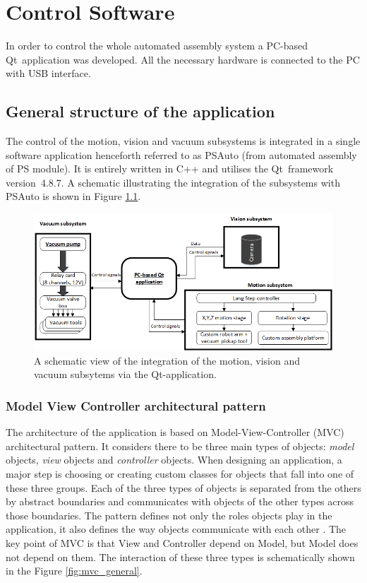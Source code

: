 \chapter{Control Software}

In order to control the whole automated assembly system a PC-based Qt~application was developed. All the necessary hardware is connected to the PC with USB interface.

\section{General structure of the application}

The control of the motion, vision and vacuum subsystems is integrated in a single software application henceforth referred to as PSAuto (from automated assembly of PS module). It is entirely written in C++ and utilises the Qt~framework version~4.8.7. A schematic illustrating the integration of the subsystems with PSAuto is shown in Figure \ref{fig:general_app_structure}.

\begin{figure}[ht]\centering
\includegraphics[width=1\linewidth]{Data/Control_Software/Whole_system_diagram_(English).png}
\caption{A schematic view of the integration of the motion, vision and vacuum subsytems via the Qt-application.}
\label{fig:general_app_structure}
\end{figure}



\subsection{Model View Controller architectural pattern}

The architecture of the application is based on Model-View-Controller (MVC) architectural pattern. It considers there to be three main types of objects: \emph{model} objects, \emph{view} objects and \emph{controller} objects. When designing an application, a major step is choosing or creating custom classes for objects that fall into one of these three groups. Each of the three types of objects is separated from the others by abstract boundaries and communicates with objects of the other types across those boundaries. The pattern defines not only the roles objects play in the application, it also defines the way objects communicate with each other \cite{apple_MVC}. The key point of MVC is that View and Controller depend on Model, but Model does not depend on them. The  interaction of these three types is schematically shown in the Figure \ref{fig:mvc_general}.

